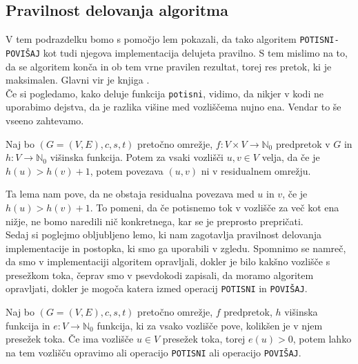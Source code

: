 \documentclass[mat1]{fmfdelo}
\newcommand{\N}{\mathbb N}
\begin{document}
\subsection{Pravilnost delovanja algoritma}

V tem podrazdelku bomo s pomočjo lem pokazali, da tako algoritem \texttt{POTISNI-POVIŠAJ} kot tudi njegova implementacija delujeta pravilno. S tem mislimo na to, da se algoritem konča in ob tem vrne pravilen rezultat, torej res pretok, ki je maksimalen. Glavni vir je knjiga \cite{clrs}.\\

Če si pogledamo, kako deluje funkcija \texttt{potisni}, vidimo, da nikjer v kodi ne uporabimo dejstva, da je razlika višine med vozliščema nujno ena. Vendar to še vseeno zahtevamo.

\begin{lema}
Naj bo $(G = (V,E), c, s, t)$ pretočno omrežje, $f\colon V \times V \rightarrow \N_0$ predpretok v $G$ in $h\colon V \rightarrow \N_0$ višinska funkcija. Potem za vsaki vozlišči $u,v \in V$ velja, da če je $h(u) > h(v) + 1$, potem povezava $(u,v)$ ni v residualnem omrežju.
\end{lema}

Ta lema nam pove, da ne obstaja residualna povezava med $u$ in $v$, če je $h(u) > h(v) + 1$. To pomeni, da če potisnemo tok v vozlišče za več kot ena nižje, ne bomo naredili nič konkretnega, kar se je preprosto prepričati.\\


Sedaj si poglejmo obljubljeno lemo, ki nam zagotavlja pravilnost delovanja implementacije in postopka, ki smo ga uporabili v zgledu. Spomnimo se namreč, da smo v implementaciji algoritem opravljali, dokler je bilo kakšno vozlišče s presežkom toka, čeprav smo v psevdokodi zapisali, da moramo algoritem opravljati, dokler je mogoča katera izmed operacij \texttt{POTISNI} in \texttt{POVIŠAJ}.

\begin{lema}\label{lem:potisk_ali_povisanje}
Naj bo $(G=(V,E),c,s,t)$ pretočno omrežje, $f$ predpretok, $h$ višinska funkcija in $e\colon V \rightarrow \N_0$ funkcija, ki za vsako vozlišče pove, kolikšen je v njem presežek toka. Če ima vozlišče $u\in V$ presežek toka, torej $e(u) > 0$, potem lahko na tem vozlišču opravimo ali operacijo \texttt{POTISNI} ali operacijo \texttt{POVIŠAJ}.
\end{lema}
\end{document}
